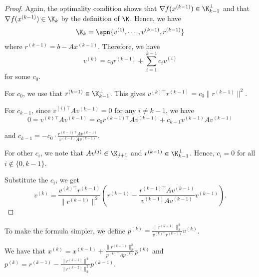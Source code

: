 \begin{proof}
Again, the optimality condition shows that $\nabla f(x^{(k-1)})\in\K_{k-1}^{\perp}$
and that $\nabla f(x^{(k-1)})\in\K_{k}$ by the definition of $\K$.
Hence, we have
\[
\K_{k}=\spn\{v^{(1)},\cdots,v^{(k-1)},r^{(k-1)}\}
\]
where $r^{(k-1)}=b-Ax^{(k-1)}$. Therefore, we have
\[
v^{(k)}=c_{0}r^{(k-1)}+\sum_{i=1}^{k-1}c_{i}v^{(i)}
\]
for some $c_{0}$. 

For $c_{0}$, we use that $r^{(k-1)}\in\K_{k-1}^{\perp}$. This gives
$v^{(k)\top}r^{(k-1)}=c_{0}\|r^{(k-1)}\|^{2}$.

For $c_{k-1}$, since $v^{(i)\top}Av^{(k-1)}=0$ for any $i\neq k-1$,
we have
\[
0=v^{(k)\top}Av^{(k-1)}=c_{0}r^{(k-1)\top}Av^{(k-1)}+c_{k-1}v^{(k-1)}Av^{(k-1)}
\]

and $c_{k-1}=-c_{0}\cdot\frac{r^{(k-1)\top}Av^{(k-1)}}{v^{(k-1)}Av^{(k-1)}}$. 

For other $c_{i}$, we note that $Av^{(j)}\in\K_{j+1}$ and $r^{(k-1)}\in\K_{k-1}^{\perp}$.
Hence, $c_{i}=0$ for all $i\notin\{0,k-1\}$. 

Substitute the $c_{i}$, we get
\[
v^{(k)}=\frac{v^{(k)\top}r^{(k-1)}}{\|r^{(k-1)}\|^{2}}\left(r^{(k-1)}-\frac{r^{(k-1)\top}Av^{(k-1)}}{v^{(k-1)}Av^{(k-1)}}v^{(k-1)}\right).
\]
\end{proof}
To make the formula simpler, we define $p^{(k)}=\frac{\|r^{(k-1)}\|_{2}^{2}}{v^{(k)\top}r^{(k-1)}}v^{(k)}$.
\begin{lem}
We have that $x^{(k)}=x^{(k-1)}+\frac{\|r^{(k-1)}\|_{2}^{2}}{p^{(k)\top}Ap^{(k)}}p^{(k)}$
and $p^{(k)}=r^{(k-1)}-\frac{\|r^{(k-1)}\|^{2}}{\|r^{(k-2)}\|_{2}^{2}}p^{(k-1)}.$
\end{lem}

